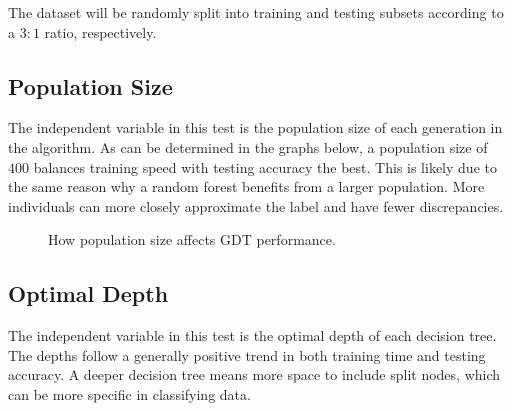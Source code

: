 \documentclass[12pt]{article}
\begin{document}
The dataset will be randomly split into training and testing subsets according to a $3:1$ ratio, respectively.

\subsection{Population Size}

The independent variable in this test is the population size of each generation in the algorithm. As can be determined in the graphs below, a population size of $400$ balances training speed with testing accuracy the best. This is likely due to the same reason why a random forest benefits from a larger population. More individuals can more closely approximate the label and have fewer discrepancies.

\begin{figure}[H]
    \centering
    \caption{How population size affects GDT performance.}
\end{figure}

\subsection{Optimal Depth}

The independent variable in this test is the optimal depth of each decision tree. The depths follow a generally positive trend in both training time and testing accuracy. A deeper decision tree means more space to include split nodes, which can be more specific in classifying data.
\end{document}
